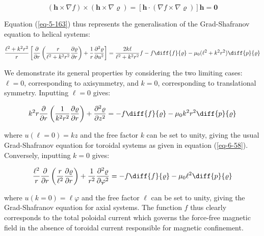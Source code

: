 \begin{equation}
    (\mathbf{h}\times\nabla f)\times(\mathbf{h}\times\nabla\varrho)=\left[\mathbf{h}\cdot(\nabla f\times\nabla\varrho)\right]\mathbf{h}=\mathbf{0}
\end{equation}

Equation (\ref{eq-5-163}) thus represents the generalisation of the Grad-Shafranov equation to helical systems:

\begin{equation}
    \label{eq-5-164}
    \frac{\ell^2+k^2r^2}{r}\left[\frac{\partial}{\partial r}\left(\frac{r}{\ell^2+k^2r^2}\frac{\partial\varrho}{\partial r}\right)+\frac{1}{r}\frac{\partial^2\varrho}{\partial u^2}\right]=\frac{2k\ell}{\ell^2+k^2r^2}f-f\diff{f}{\varrho}-\mu_0(\ell^2+k^2r^2)\diff{p}{\varrho}
\end{equation}

We demonstrate its general properties by considering the two limiting cases: $\ell=0$, corresponding to axisymmetry, and $k=0$, corresponding to translational symmetry. Inputting $\ell=0$ gives:

\begin{equation}
    k^2r\frac{\partial}{\partial r}\left(\frac{1}{k^2r^2}\frac{\partial\varrho}{\partial r}\right)+\frac{\partial^2\varrho}{\partial z^2}=-f\diff{f}{\varrho}-\mu_0k^2r^2\diff{p}{\varrho}
\end{equation}

where $u(\ell=0)=kz$ and the free factor $k$ can be set to unity, giving the usual Grad-Shafranov equation for toroidal systems as given in equation (\ref{eq-6-58}). Conversely, inputting $k=0$ gives:

\begin{equation}
    \frac{\ell^2}{r}\frac{\partial}{\partial r}\left(\frac{r}{\ell^2}\frac{\partial\varrho}{\partial r}\right)+\frac{1}{r^2}\frac{\partial^2\varrho}{\partial\varphi^2}=-f\diff{f}{\varrho}-\mu_0\ell^2\diff{p}{\varrho}
\end{equation}

where $u(k=0)=\ell\varphi$ and the free factor $\ell$ can be set to unity, giving the Grad-Shafranov equation for axial systems. The function $f$ thus clearly corresponds to the total poloidal current which governs the force-free magnetic field in the absence of toroidal current responsible for magnetic confinement.